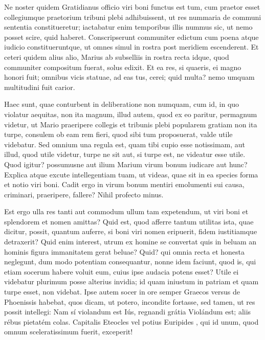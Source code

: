  Ne noster quidem Gratidianus officio viri boni functus est tum, cum praetor esset collegiumque praetorium tribuni plebi adhibuissent, ut res nummaria de communi sententia constitueretur; iactabatur enim temporibus illis nummus sic, ut nemo posset scire, quid haberet. Conscripserunt communiter edictum cum poena atque iudicio constitueruntque, ut omnes simul in rostra post meridiem escenderent. Et ceteri quidem alius alio, Marius ab subselliis in rostra recta idque, quod communiter compositum fuerat, solus edixit. Et ea res, si quaeris, ei magno honori fuit; omnibus vicis statuae, ad eas tus, cerei; quid multa? nemo umquam multitudini fuit carior.

 Haec sunt, quae conturbent in deliberatione non numquam, cum id, in quo violatur aequitas, non ita magnum, illud autem, quod ex eo paritur, permagnum videtur, ut Mario praeripere collegis et tribunis plebi popularem gratiam non ita turpe, consulem ob eam rem fieri, quod sibi tum proposuerat, valde utile videbatur. Sed omnium una regula est, quam tibi cupio esse notissimam, aut illud, quod utile videtur, turpe ne sit aut, si turpe est, ne videatur esse utile. Quod igitur? possumusne aut ilium Marium virum bonum iudicare aut hunc? Explica atque excute intellegentiam tuam, ut videas, quae sit in ea species forma et notio viri boni. Cadit ergo in virum bonum mentiri emolumenti sui causa, criminari, praeripere, fallere? Nihil profecto minus.

 Est ergo ulla res tanti aut commodum ullum tam expetendum, ut viri boni et splendorem et nomen amittas? Quid est, quod afferre tantum utilitas ista, quae dicitur, possit, quantum auferre, si boni viri nomen eripuerit, fidem iustitiamque detraxerit? Quid enim interest, utrum ex homine se convertat quis in beluam an hominis figura immanitatem gerat beluae? Quid? qui omnia recta et honesta neglegunt, dum modo potentiam consequantur, nonne idem faciunt, quod is, qui etiam socerum habere voluit eum, cuius ipse audacia potens esset? Utile ei videbatur plurimum posse alterius invidia; id quam iniustum in patriam et quam turpe esset, non videbat. Ipse autem socer in ore semper Graecos versus de Phoenissis habebat, quos dicam, ut potero, incondite fortasse, sed tamen, ut res possit intellegi: Nam sí violandum est Iús, regnandi grátia Violándum est; aliis rébus pietatém colas. Capitalis Eteocles vel potius Euripides , qui id unum, quod omnum sceleratissimum fuerit, exceperit!

